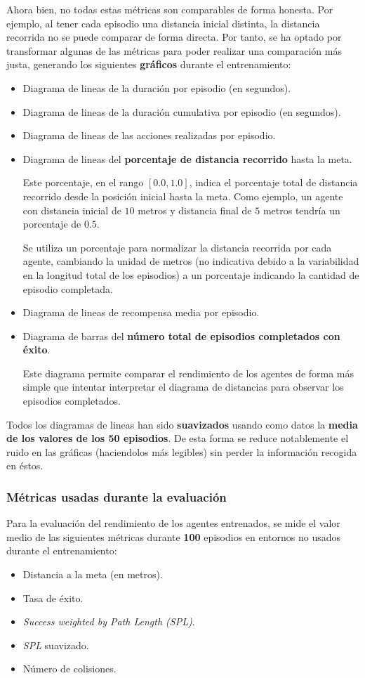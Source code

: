 Ahora bien, no todas estas métricas son comparables de forma honesta. Por ejemplo, al tener cada episodio una distancia inicial distinta, la distancia recorrida no se puede comparar de forma directa. Por tanto, se ha optado por transformar algunas de las métricas para poder realizar una comparación más justa, generando los siguientes \textbf{gráficos} durante el entrenamiento:
\begin{itemize}
	\item Diagrama de lineas de la duración por episodio (en segundos).
	\item Diagrama de lineas de la duración cumulativa por episodio (en segundos).
	\item Diagrama de lineas de las acciones realizadas por episodio.
	\item Diagrama de lineas del \textbf{porcentaje de distancia recorrido} hasta la meta.
	
	Este porcentaje, en el rango $[0.0, 1.0]$, indica el porcentaje total de distancia recorrido desde la posición inicial hasta la meta. Como ejemplo, un agente con distancia inicial de $10$ metros y distancia final de $5$ metros tendría un porcentaje de $0.5$.
	
	Se utiliza un porcentaje para normalizar la distancia recorrida por cada agente, cambiando la unidad de metros (no indicativa debido a la variabilidad en la longitud total de los episodios) a un porcentaje indicando la cantidad de episodio completada.
	\item Diagrama de lineas de recompensa media por episodio.
	\item Diagrama de barras del \textbf{número total de episodios completados con éxito}.
	
	Este diagrama permite comparar el rendimiento de los agentes de forma más simple que intentar interpretar el diagrama de distancias para observar los episodios completados.
\end{itemize}

Todos los diagramas de lineas han sido \textbf{suavizados} usando como datos la \textbf{media de los valores de los 50 episodios}. De esta forma se reduce notablemente el ruido en las gráficas (haciendolos más legibles) sin perder la información recogida en éstos.

\subsubsection{Métricas usadas durante la evaluación}

Para la evaluación del rendimiento de los agentes entrenados, se mide el valor medio de las siguientes métricas durante \textbf{100} episodios en entornos no usados durante el entrenamiento:
\begin{itemize}
	\item Distancia a la meta (en metros).
	\item Tasa de éxito.
	\item \textit{Success weighted by Path Length (SPL)}.
	\item \textit{SPL} suavizado.
	\item Número de colisiones.
\end{itemize}

